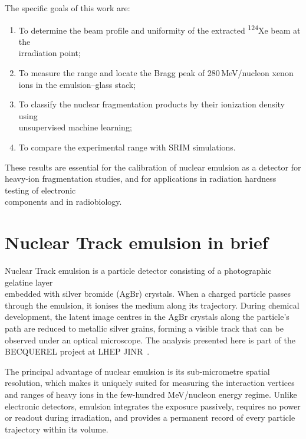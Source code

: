 \documentclass[12pt,a4paper]{article}
\begin{document}
The specific goals of this work are:

\begin{enumerate}
  \item To determine the beam profile and uniformity of the extracted
        \textsuperscript{124}Xe beam at the \\ irradiation point;
  \item To measure the range and locate the Bragg peak of
        280\,MeV/nucleon xenon ions in the emulsion--glass stack;
  \item To classify the nuclear fragmentation products by their
        ionization density using \\ unsupervised machine learning;
  \item To compare the experimental range with SRIM simulations.
\end{enumerate}

These results are essential for the calibration of nuclear emulsion as
a detector for heavy-ion fragmentation studies, and for applications in
radiation hardness testing of electronic \\ components and in
radiobiology.

\section{Nuclear Track emulsion in brief}
\label{sec:emulsion}

Nuclear Track emulsion is a particle detector consisting of a photographic
gelatine layer \\ embedded with silver bromide (AgBr) crystals. When a
charged particle passes through the emulsion, it ionises the medium
along its trajectory. During chemical development, the latent image
centres in the AgBr crystals along the particle's path are reduced to
metallic silver grains, forming a visible track that can be observed
under an optical microscope. The analysis presented here is part of
the BECQUEREL project at LHEP JINR~\cite{barkas, becquerel, zarubin2016}.

The principal advantage of nuclear emulsion is its sub-micrometre
spatial resolution, which makes it uniquely suited for measuring the
interaction vertices and ranges of heavy ions in the few-hundred
MeV/nucleon energy regime. Unlike electronic detectors, emulsion
integrates the exposure passively, requires no power or readout during
irradiation, and provides a permanent record of every particle
trajectory within its volume.
\end{document}
